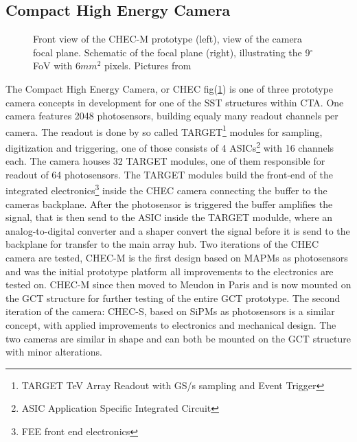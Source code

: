 \documentclass[12pt,article,type=msc,colorback,accentcolor=tud9c]{tudthesis}
\begin{document}
\subsection{Compact High Energy Camera}
\begin{figure}[t!]
\begin{centering}
\caption[CHEC focal plane]{Front view of the CHEC-M prototype (left), view of the camera focal plane. Schematic of the focal plane (right), illustrating the 9$^\circ$ FoV with 6$mm^2$ pixels. Pictures from \cite{Rich}}
\label{fig:GCT_Pic}
\end{centering}
\end{figure}


The Compact High Energy Camera, or CHEC fig(\ref{fig:GCT_Pic}) is one of three prototype camera concepts in development for one of the SST structures within CTA. One camera features 2048 photosensors, building equaly many readout channels per camera. The readout is done by so called TARGET\footnote{TARGET TeV Array Readout with GS/s sampling and Event Trigger} modules for sampling, digitization and triggering, one of those consists of 4 ASICs\footnote{ASIC Application Specific Integrated Circuit} with 16 channels each. The camera houses 32 TARGET modules, one of them responsible for readout of 64 photosensors. The TARGET modules build the front-end of the integrated electronics\footnote{FEE front end electronics} inside the CHEC camera connecting the buffer to the cameras backplane. After the photosensor is triggered the buffer amplifies the signal, that is then send to the ASIC inside the TARGET modulde, where an analog-to-digital converter and a shaper convert the signal before it is send to the backplane for transfer to the main array hub. Two iterations of the CHEC camera are tested, CHEC-M is the first design based on MAPMs as photosensors and was the initial prototype platform all improvements to the electronics are tested on. CHEC-M since then moved to Meudon in Paris and is now mounted on the GCT structure for further testing of the entire GCT prototype. The second iteration of the camera: CHEC-S, based on SiPMs as photosensors is a similar concept, with applied improvements to electronics and mechanical design. The two cameras are similar in shape and can both be mounted on the GCT structure with minor alterations.\\
\end{document}
